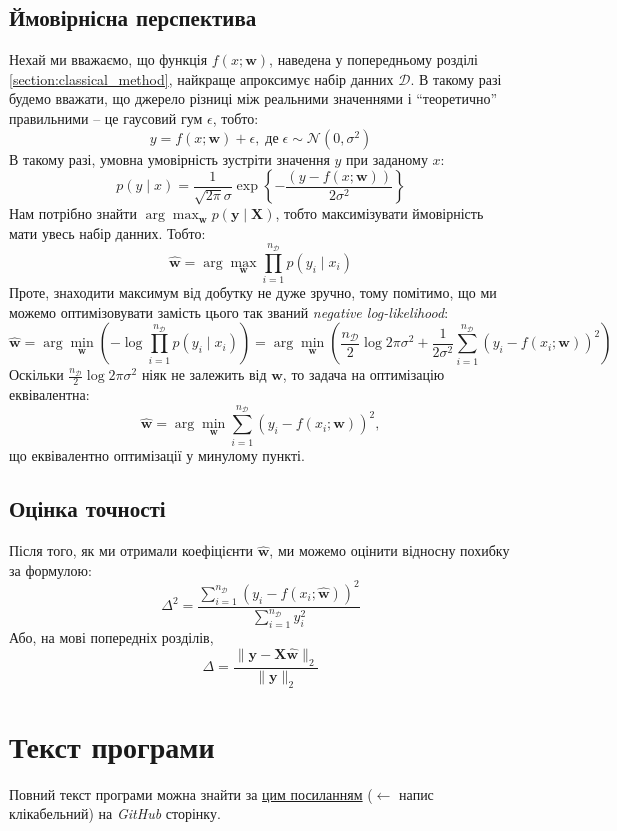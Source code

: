 \documentclass[12pt]{extarticle}
\begin{document}
\subsection{Ймовірнісна перспектива}
Нехай ми вважаємо, що функція $f(x;\mathbf{w})$, наведена у попередньому розділі \ref{section:classical_method}, найкраще апроксимує набір данних $\mathcal{D}$. В такому разі будемо вважати, що джерело різниці між реальними значеннями і ``теоретично'' правильними -- це гаусовий гум $\epsilon$, тобто:
\[
y = f(x;\mathbf{w}) + \epsilon, \; \text{де} \; \epsilon \sim \mathcal{N}(0,\sigma^2)
\]
В такому разі, умовна умовірність зустріти значення $y$ при заданому $x$:
\[
p(y \mid x) = \frac{1}{\sqrt{2\pi}\sigma}\exp\left\{-\frac{(y-f(x;\mathbf{w}))}{2\sigma^2}\right\}
\]
Нам потрібно знайти $\arg\max_{\mathbf{w}} p(\mathbf{y} \mid \mathbf{X})$, тобто максимізувати ймовірність мати увесь набір данних. Тобто:
\[
\hat{\mathbf{w}} = \arg\max_{\mathbf{w}} \prod_{i=1}^{n_{\mathcal{D}}}p(y_i \mid x_i)
\]
Проте, знаходити максимум від добутку не дуже зручно, тому помітимо, що ми можемо оптимізовувати замість цього так званий \textit{negative log-likelihood}:
\[
\hat{\mathbf{w}} = \arg\min_{\mathbf{w}}\left(-\log \prod_{i=1}^{n_{\mathcal{D}}}p(y_i\mid x_i)\right) = \arg\min_{\mathbf{w}}\left(\frac{n_{\mathcal{D}}}{2}\log 2\pi\sigma^2 + \frac{1}{2\sigma^2}\sum_{i=1}^{n_{\mathcal{D}}}(y_i-f(x_i;\mathbf{w}))^2\right)
\]
Оскільки $\frac{n_{\mathcal{D}}}{2}\log 2\pi \sigma^2$ ніяк не залежить від $\mathbf{w}$, то задача на оптимізацію еквівалентна:
\[
\hat{\mathbf{w}} = \arg\min_{\mathbf{w}} \sum_{i=1}^{n_{\mathcal{D}}} (y_i-f(x_i;\mathbf{w}))^2,
\]
що еквівалентно оптимізації у минулому пункті. 

\subsection{Оцінка точності}
Після того, як ми отримали коефіцієнти $\hat{\mathbf{w}}$, ми можемо оцінити відносну похибку за формулою:
\[
\Delta^2 = 
\frac{\sum_{i=1}^{n_{\mathcal{D}}}
(y_i-f(x_i;\hat{\mathbf{w}}))^2}{\sum_{i=1}^{n_{\mathcal{D}}}
y_i^2}
\]
Або, на мові попередніх розділів,
\[
\Delta = \frac{\|\mathbf{y}-\mathbf{X}\hat{\mathbf{w}}\|_2}{\|\mathbf{y}\|_2}
\]

\pagebreak
\section{Текст програми}

Повний текст програми можна знайти за \href{https://github.com/ZamDimon/University-Homeworks/tree/main/Term%205/Numerical%20Analysis/code/lab_3}{цим посиланням} ($\leftarrow$ напис клікабельний) на \textit{GitHub} сторінку.
\end{document}
